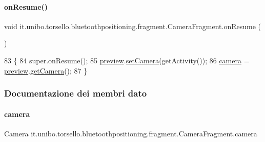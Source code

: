 \paragraph{\texorpdfstring{on\+Resume()}{onResume()}}
{\footnotesize\ttfamily void it.\+unibo.\+torsello.\+bluetoothpositioning.\+fragment.\+Camera\+Fragment.\+on\+Resume (\begin{DoxyParamCaption}{ }\end{DoxyParamCaption})}


\begin{DoxyCode}
83                            \{
84         super.onResume();
85         \hyperlink{classit_1_1unibo_1_1torsello_1_1bluetoothpositioning_1_1fragment_1_1CameraFragment_af14f8f1e4107c9a9063cf70d1fbb5bb5_af14f8f1e4107c9a9063cf70d1fbb5bb5}{preview}.\hyperlink{classit_1_1unibo_1_1torsello_1_1bluetoothpositioning_1_1util_1_1CameraPreviewUtil_acc49f348e381371fcad9d428ea4a15ca_acc49f348e381371fcad9d428ea4a15ca}{setCamera}(getActivity());
86         \hyperlink{classit_1_1unibo_1_1torsello_1_1bluetoothpositioning_1_1fragment_1_1CameraFragment_a70e1c67d2b127530751de08cb289b4c3_a70e1c67d2b127530751de08cb289b4c3}{camera} = \hyperlink{classit_1_1unibo_1_1torsello_1_1bluetoothpositioning_1_1fragment_1_1CameraFragment_af14f8f1e4107c9a9063cf70d1fbb5bb5_af14f8f1e4107c9a9063cf70d1fbb5bb5}{preview}.\hyperlink{classit_1_1unibo_1_1torsello_1_1bluetoothpositioning_1_1util_1_1CameraPreviewUtil_a24b83bd2a152f8f12824ccf190a90369_a24b83bd2a152f8f12824ccf190a90369}{getCamera}();
87     \}
\end{DoxyCode}


\subsubsection{Documentazione dei membri dato}
\hypertarget{classit_1_1unibo_1_1torsello_1_1bluetoothpositioning_1_1fragment_1_1CameraFragment_a70e1c67d2b127530751de08cb289b4c3_a70e1c67d2b127530751de08cb289b4c3}{}\label{classit_1_1unibo_1_1torsello_1_1bluetoothpositioning_1_1fragment_1_1CameraFragment_a70e1c67d2b127530751de08cb289b4c3_a70e1c67d2b127530751de08cb289b4c3} 
\paragraph{\texorpdfstring{camera}{camera}}
{\footnotesize\ttfamily Camera it.\+unibo.\+torsello.\+bluetoothpositioning.\+fragment.\+Camera\+Fragment.\+camera\hspace{0.3cm}{\ttfamily [package]}}

